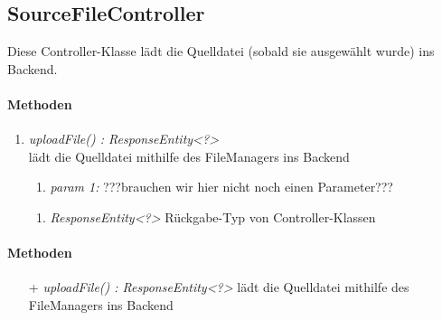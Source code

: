 \subsection{SourceFileController}
Diese Controller-Klasse lädt die Quelldatei (sobald sie ausgewählt wurde) ins Backend.

\paragraph{Methoden}

\begin{enumerate}[+]
	\item \textit{ uploadFile() : ResponseEntity<?>}\\
	 lädt die Quelldatei mithilfe des FileManagers ins Backend
	
	\begin{enumerate}[$\bullet$]
		\item \textit{param 1:} ???brauchen wir hier nicht noch einen Parameter???
	\end{enumerate}
	\vspace{-0.2cm}
	\begin{enumerate}[$\circ$]
		\item \textit{ResponseEntity<?>} Rückgabe-Typ von Controller-Klassen
	\end{enumerate}

\end{enumerate}
\paragraph{Methoden}
\begin{itemize}
\item[+] \textit{ uploadFile() : ResponseEntity<?>}
 lädt die Quelldatei mithilfe des FileManagers ins Backend 
\end{itemize}